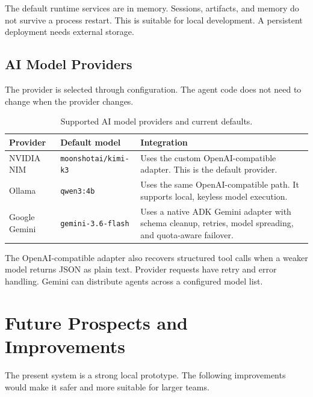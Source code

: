 \documentclass[11pt,a4paper]{article}
\begin{document}
The default runtime services are in memory. Sessions, artifacts, and memory do
not survive a process restart. This is suitable for local development. A
persistent deployment needs external storage.

\subsection{AI Model Providers}

The provider is selected through configuration. The agent code does not need to
change when the provider changes.

\begin{table}[H]
\centering
\small
\begin{tabularx}{\textwidth}{L{0.18\textwidth}L{0.28\textwidth}Y}
\toprule
\textbf{Provider} & \textbf{Default model} & \textbf{Integration} \\
\midrule
NVIDIA NIM & \texttt{moonshotai/kimi-k3} & Uses the custom OpenAI-compatible adapter. This is the default provider. \\
Ollama & \texttt{qwen3:4b} & Uses the same OpenAI-compatible path. It supports local, keyless model execution. \\
Google Gemini & \texttt{gemini-3.6-flash} & Uses a native ADK Gemini adapter with schema cleanup, retries, model spreading, and quota-aware failover. \\
\bottomrule
\end{tabularx}
\caption{Supported AI model providers and current defaults.}
\label{tab:model-providers}
\end{table}

The OpenAI-compatible adapter also recovers structured tool calls when a weaker
model returns JSON as plain text. Provider requests have retry and error
handling. Gemini can distribute agents across a configured model list.

\section{Future Prospects and Improvements}
\label{sec:future}

The present system is a strong local prototype. The following improvements
would make it safer and more suitable for larger teams.
\end{document}
